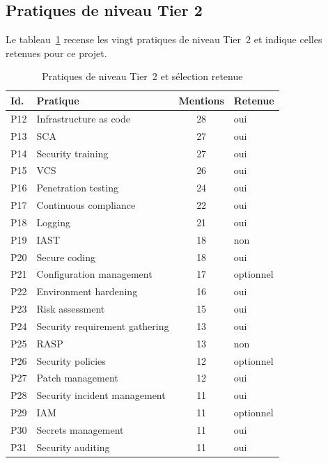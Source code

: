 \subsection{Pratiques de niveau Tier 2}

Le tableau~\ref{tab:tier2} recense les vingt pratiques de niveau Tier~2 et
indique celles retenues pour ce projet.

\begin{table}[H]
\centering
\caption{Pratiques de niveau Tier~2 et sélection retenue}
\label{tab:tier2}
\small
\begin{tabular}{@{}llcl@{}}
\toprule
\textbf{Id.} & \textbf{Pratique} & \textbf{Mentions} & \textbf{Retenue} \\
\midrule
P12 & Infrastructure as code         & 28 & \fait{} oui \\
P13 & SCA                            & 27 & \fait{} oui \\
P14 & Security training              & 27 & \fait{} oui \\
P15 & VCS                            & 26 & \fait{} oui \\
P16 & Penetration testing            & 24 & \fait{} oui \\
P17 & Continuous compliance          & 22 & \fait{} oui \\
P18 & Logging                        & 21 & \fait{} oui \\
P19 & IAST                           & 18 & \nonfait{} non \\
P20 & Secure coding                  & 18 & \fait{} oui \\
P21 & Configuration management       & 17 & optionnel \\
P22 & Environment hardening          & 16 & \fait{} oui \\
P23 & Risk assessment                & 15 & \fait{} oui \\
P24 & Security requirement gathering & 13 & \fait{} oui \\
P25 & RASP                           & 13 & \nonfait{} non \\
P26 & Security policies              & 12 & optionnel \\
P27 & Patch management               & 12 & \fait{} oui \\
P28 & Security incident management   & 11 & \fait{} oui \\
P29 & IAM                            & 11 & optionnel \\
P30 & Secrets management             & 11 & \fait{} oui \\
P31 & Security auditing              & 11 & \fait{} oui \\
\bottomrule
\end{tabular}
\end{table}


